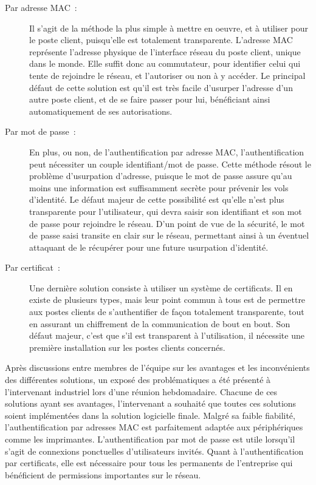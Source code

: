 \begin{description}
\item[Par adresse MAC~:] Il s'agit de la méthode la plus simple à mettre en oeuvre, et à utiliser pour le poste client, puisqu'elle est totalement transparente. L'adresse MAC représente l'adresse physique de l'interface réseau du poste client, unique dans le monde. Elle suffit donc au commutateur, pour identifier celui qui tente de rejoindre le réseau, et l'autoriser ou non à y accéder. Le principal défaut de cette solution est qu'il est très facile d'usurper l'adresse d'un autre poste client, et de se faire passer pour lui, bénéficiant ainsi automatiquement de ses autorisations.
\item[Par mot de passe~:] En plus, ou non, de l'authentification par adresse MAC, l'authentification peut nécessiter un couple identifiant/mot de passe. Cette méthode résout le problème d'usurpation d'adresse, puisque le mot de passe assure qu'au moins une information est suffisamment secrète pour prévenir les vols d'identité. Le défaut majeur de cette possibilité est qu'elle n'est plus transparente pour l'utilisateur, qui devra saisir son identifiant et son mot de passe pour rejoindre le réseau. D'un point de vue de la sécurité, le mot de passe saisi transite en clair sur le réseau, permettant ainsi à un éventuel attaquant de le récupérer pour une future usurpation d'identité.
\item[Par certificat~:] Une dernière solution consiste à utiliser un système de certificats. Il en existe de plusieurs types, mais leur point commun à tous est de permettre aux postes clients de s'authentifier de façon totalement transparente, tout en assurant un chiffrement de la communication de bout en bout. Son défaut majeur, c'est que s'il est transparent à l'utilisation, il nécessite une première installation sur les postes clients concernés.
\end{description}

Après discussions entre membres de l'équipe sur les avantages et les inconvénients des différentes solutions, un exposé des problématiques a été présenté à l'intervenant industriel lors d'une réunion hebdomadaire. Chacune de ces solutions ayant ses avantages, l'intervenant a souhaité que toutes ces solutions soient implémentées dans la solution logicielle finale. Malgré sa faible fiabilité, l'authentification par adresses MAC est parfaitement adaptée aux périphériques comme les imprimantes. L'authentification par mot de passe est utile lorsqu'il s'agit de connexions ponctuelles d'utilisateurs invités. Quant à l'authentification par certificats, elle est nécessaire pour tous les permanents de l'entreprise qui bénéficient de permissions importantes sur le réseau.

